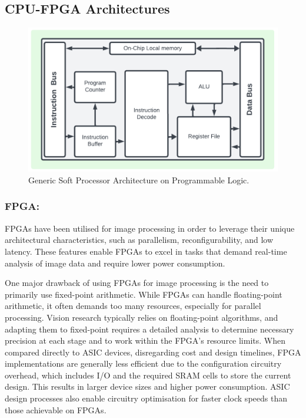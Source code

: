 \subsection{CPU-FPGA Architectures}
\begin{figure}[t]
\centering
\includegraphics[width=\linewidth]{Images/Microblaze.png}
\caption[Generic Soft Processor Architecture]{Generic Soft Processor Architecture on Programmable Logic. }
\label{fig:AlgoChar}
\end{figure}


\subsubsection{FPGA:}
FPGAs have been utilised for image processing in order to leverage their unique architectural characteristics, such as parallelism, reconfigurability, and low latency. These features enable FPGAs to excel in tasks that demand real-time analysis of image data and require lower power consumption\cite{TakTsuMar08}. 

One major drawback of using FPGAs for image processing is the need to primarily use fixed-point arithmetic. While FPGAs can handle floating-point arithmetic, it often demands too many resources, especially for parallel processing. Vision research typically relies on floating-point algorithms, and adapting them to fixed-point requires a detailed analysis to determine necessary precision at each stage and to work within the FPGA's resource limits\cite{Mac05}. When compared directly to ASIC devices, disregarding cost and design timelines, FPGA implementations are generally less efficient due to the configuration circuitry overhead, which includes I/O and the required SRAM cells to store the current design. This results in larger device sizes and higher power consumption. ASIC design processes also enable circuitry optimisation for faster clock speeds than those achievable on FPGAs\cite{BauDanRoss07}.

